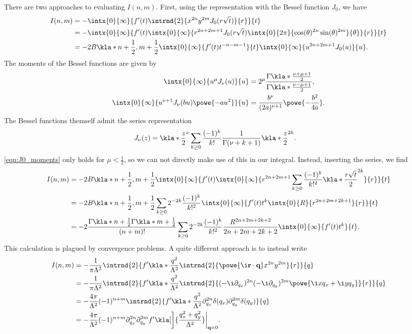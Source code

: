 \documentclass[english, parskip=full]{scrartcl}
\begin{document}
There are two approaches to evaluating $I(n,m)$.
First, using the representation with the Bessel function $J_0$, we have
\begin{align}
I(n,m) &= -\intx{0}{\infty}{ f'(t) \intrnd{2}{x^{2n} y^{2m} J_0(r \sqrt{t})}{r} }{t}\\
&= -\intx{0}{\infty}{f'(t) \intx{0}{\infty}{r^{2n+2m+1} J_0(r\sqrt{t}) \intx{0}{2\pi}{\cos(\theta)^{2n} \sin(\theta)^{2m}}{\theta} }{r} }{t}\\
&= -2 B\kla*{n+\frac{1}{2}, m+\frac{1}{2}} \intx{0}{\infty}{ f'(t) t^{-n-m-1} }{t} \intx{0}{\infty}{u^{2n+2m+1} J_0(u)}{u}.
\end{align}
The moments of the Bessel functions are given by \cite{NIST_Bessel}
\begin{align}
\intx{0}{\infty}{u^\mu J_\nu(u)}{u} &= 2^\mu \frac{\Gamma\kla*{\frac{\nu+\mu+1}{2}}}{\Gamma\kla*{\frac{\nu-\mu+1}{2}}} \label{eqn:J0_moments},\\
\intx{0}{\infty}{u^{\nu+1} J_\nu(bu) \powe{-au^2}}{u} &= \frac{b^\nu }{(2a)^{\nu+1}}\powe{-\frac{b^2}{4a}}.
\end{align}
The Bessel functions themself admit the series representation
\begin{align}
J_\nu(z) &= \kla*{\frac{z}{2}}^\nu \sum_{k\ge 0} \frac{(-1)^k}{k!} \frac{1}{\Gamma(\nu+k+1)} \kla*{\frac{z}{2}}^{2k}.
\end{align}
\autoref{eqn:J0_moments} only holds for $\mu < \frac{1}{2}$, so we can not directly make use of this in our integral.
Instead, inserting the series, we find
\begin{align}
I(n,m) &= -2B\kla*{n+\frac{1}{2}, m+\frac{1}{2}} \intx{0}{\infty}{f'(t) \intx{0}{\infty}{r^{2n+2m+1}  \sum_{k\ge 0} \frac{(-1)^k}{k!^2} \kla*{\frac{r\sqrt{t}}{2}}^{2k} }{r} }{t}\\
&= -2B\kla*{n+\frac{1}{2}, m+\frac{1}{2}}\sum_{k\ge 0} 2^{-2k} \frac{(-1)^k}{k!^2} \intx{0}{\infty}{f'(t) t^k \intx{0}{R}{r^{2n+2m+2k+1} }{r} }{t} \\
&= -2\frac{\Gamma\kla*{n+\frac{1}{2}} \Gamma\kla*{m+\frac{1}{2}}}{(n+m)!}\sum_{k\ge 0} 2^{-2k} \frac{(-1)^k}{k!^2} \frac{R^{2n+2m+2k+2}}{2n+2m+2k+2} \intx{0}{\infty}{f'(t) t^k }{t}.
\end{align}
This calculation is plagued by convergence problems.
A quite different approach is to instead write
\begin{align}
I(n,m) &= -\frac{1}{\pi\Lambda^2} \intrnd{2}{ f'\kla*{\frac{q^2}{\Lambda^2}} \intrnd{2}{\powe{\i \textbf{r}\cdot \textbf{q}} x^{2n} y^{2m} }{r} }{q}\\
&= -\frac{1}{\pi\Lambda^2} \intrnd{2}{ f'\kla*{\frac{q^2}{\Lambda^2}} \intrnd{2}{ (-\i \partial_{q_x})^{2n} (-\i \partial_{q_y})^{2m} \powe{\i xq_x+\i yq_y} }{r} }{q}\\
&= -\frac{4\pi}{\Lambda^2} (-1)^{n+m} \intrnd{2}{ f'\kla*{\frac{q^2}{\Lambda^2}} \partial_{q_x}^{2n} \delta(q_x) \partial_{q_y}^{2m} \delta(q_y) }{q}\\
&= -\frac{4\pi}{\Lambda^2} (-1)^{n+m} \partial_{q_x}^{2n}\partial_{q_y}^{2m} f'\kla[\bigg]{\frac{q_x^2+q_y^2}{\Lambda^2}} \bigg\vert_{\textbf{q}=0}.
\end{align}
\end{document}
